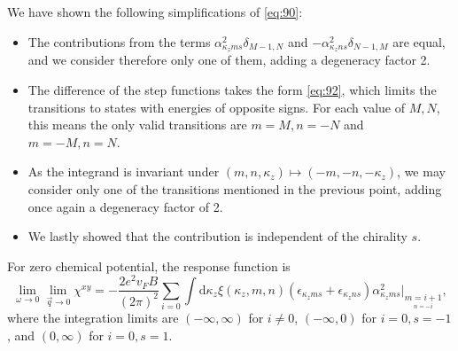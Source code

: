 \begin{summary}
  We have shown the following simplifications of \cref{eq:90}:
  \begin{itemize}
    \item The contributions from the terms \( \alpha_{\kappa_z m s}^2 \delta_{M-1, N} \) and \( - \alpha_{\kappa_z n s}^2 \delta_{N-1, M} \) are equal, and we consider therefore only one of them, adding a degeneracy factor 2.
    \item The difference of the step functions takes the form \cref{eq:92}, which limits the transitions to states with energies of opposite signs.
          For each value of \( M,N \), this means the only valid transitions are \( m=M, n=-N \) and \( m=-M, n=N \).
    \item As the integrand is invariant under \( (m,n,\kappa_z) \mapsto (-m, -n, -\kappa_z) \), we may consider only one of the transitions mentioned in the previous point, adding once again a degeneracy factor of 2.
    \item We lastly showed that the contribution is independent of the chirality \( s \).
  \end{itemize}
\end{summary}

For zero chemical potential, the response function is
\begin{equation}
  \label{eq:93}
  \lim_{\omega \to 0} \lim_{\vec{q} \to 0} \chi^{xy} =
  -\frac{2 e^2 v_F B}{(2 \pi)^2}
  \sum\limits_{i=0} \int \mathrm{d}\kappa_z
  \xi(\kappa_z, m, n) (\epsilon_{\kappa_z m s} + \epsilon_{\kappa_z n s})
  \alpha_{\kappa_z m s}^2
  \big|_{\underset{n=-i}{m=i+1}},
\end{equation}
where the integration limits are \( (-\infty, \infty) \) for \( i \neq 0 \), \( (-\infty, 0) \) for \( i = 0, s=-1 \), and \( (0, \infty) \) for \( i=0, s=1 \).

